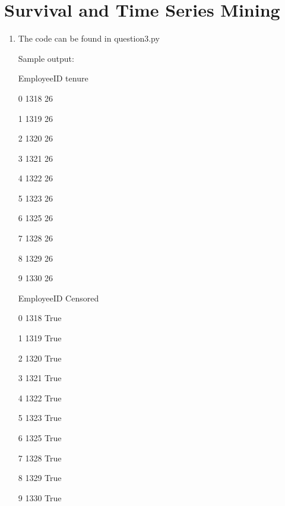 \documentclass[12pt,a4paper]{article}
\begin{document}
\section{Survival and Time Series Mining}
	\begin{enumerate}[label=(\alph*)]
		\item 
		The code can be found in question3.py		
		
		Sample output:
		
		   EmployeeID  tenure
		   
0        1318      26

1        1319      26

2        1320      26

3        1321      26

4        1322      26

5        1323      26

6        1325      26

7        1328      26

8        1329      26

9        1330      26

   EmployeeID Censored

0        1318     True

1        1319     True

2        1320     True

3        1321     True

4        1322     True

5        1323     True

6        1325     True

7        1328     True

8        1329     True

9        1330     True
	\end{enumerate}
\end{document}
